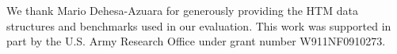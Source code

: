 \documentclass[10pt]{sigplanconf}
\begin{document}

\acks

We thank Mario Dehesa-Azuara for generously providing the HTM data structures and benchmarks used in our evaluation.
This work was supported in part by the U.S. Army Research Office under grant number W911NF0910273.



\end{document}
